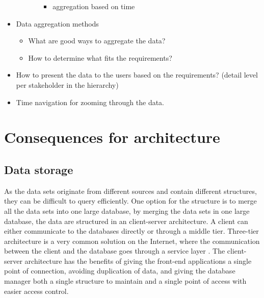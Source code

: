 \begin{itemize}
\begin{itemize}
\begin{itemize}
\begin{itemize}
				\item aggregation based on time
			\end{itemize}
		\end{itemize}
	\end{itemize}
	\item Data aggregation methods
	\begin{itemize}
		\item What are good ways to aggregate the data?
		\item How to determine what fits the requirements?
	\end{itemize}
	\item How to present the data to the users based on the requirements? (detail
	level per stakeholder in the hierarchy)
	\item Time navigation for zooming through the data.
\end{itemize}



\section{Consequences for architecture} %
\label{sec:consequences_for_architecture}
\subsection{Data storage} %
\label{sub:data_storage}
As the data sets originate from different sources and contain different
structures, they can be difficult to query efficiently. One option for the structure is to merge all the
data sets into one large database, by merging the data sets in one large
database, the data are structured in an client-server architecture. 
A client can either communicate to the databases directly or through a middle
tier. Three-tier architecture is a very common solution on the Internet, where 
the communication between the client and the database goes through a service 
layer \cite[pp. 294-297]{toftHanseMallaugDatabaser}. The client-server 
architecture has the benefits of giving the front-end applications a single 
point of connection, avoiding duplication of data, and giving the database 
manager both a single structure to maintain and a single point of access with 
easier access control.

